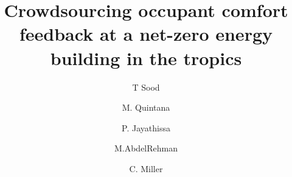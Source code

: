 \documentclass[a4paper]{jpconf} %
\begin{document}



\title{Crowdsourcing occupant comfort feedback at a net-zero energy building in the tropics} 





\author[buds]{T Sood}
\address[buds]{Building and Urban Data Science Group,  Department of Building, Singapore} 

\author[buds]{M. Quintana}

\author[buds]{P. Jayathissa}

\author[unsw]{M.AbdelRehman}

 \author[buds]{C. Miller  }


\end{document}
